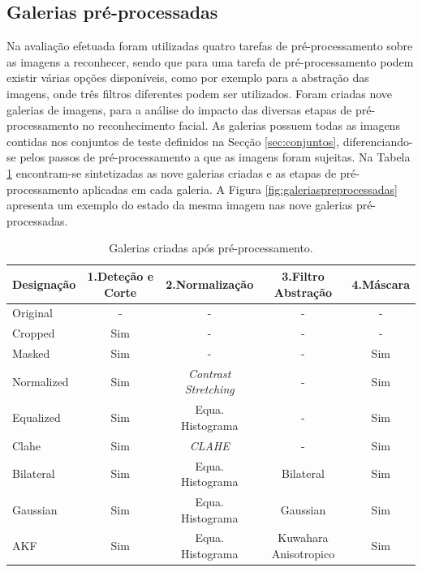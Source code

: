 \documentclass{llncs}
\begin{document}
\subsection{Galerias pré-processadas}
Na avaliação efetuada foram utilizadas quatro tarefas de pré-processamento sobre as imagens a reconhecer, sendo que para uma tarefa de pré-processamento podem existir várias opções disponíveis, como por exemplo para a abstração das imagens, onde três filtros diferentes podem ser utilizados. Foram criadas nove galerias de imagens, para a análise do impacto das diversas etapas de pré-processamento no reconhecimento facial. As galerias possuem todas as imagens contidas nos conjuntos de teste definidos na Secção \ref{sec:conjuntos}, diferenciando-se pelos passos de pré-processamento a que as imagens foram sujeitas. Na Tabela \ref{tab:colecoes} encontram-se sintetizadas as nove galerias criadas e as etapas de pré-processamento aplicadas em cada galeria. A Figura \ref{fig:galeriaspreprocessadas} apresenta um exemplo do estado da mesma imagem nas nove galerias pré-processadas.

\begin{table}[t]
	\centering
	\caption{Galerias criadas após pré-processamento.}
    \begin{tabular}{l|cccc}
    \hline\hline
    Designação & 1.Deteção e Corte   & 2.Normalização           & 3.Filtro Abstração & 4.Máscara \\
	\hline
    Original   &   -         & -                      & -                &   -      \\
    Cropped    & Sim         & -                      & -                &   -      \\
    Masked     & Sim         & -                      & -                & Sim      \\
    Normalized & Sim         & \textit{Contrast Stretching}& -           & Sim      \\
    Equalized  & Sim         & Equa. Histograma & -                & Sim      \\
    Clahe     & Sim         & \textit{CLAHE}         & -                & Sim      \\
    Bilateral  & Sim         & Equa. Histograma & Bilateral        & Sim      \\
    Gaussian   & Sim         & Equa. Histograma & Gaussian         & Sim      \\
    AKF         & Sim        & Equa. Histograma & Kuwahara Anisotropico & Sim \\
    \hline\hline
    \end{tabular}
	\label{tab:colecoes}
\end{table}
\end{document}
